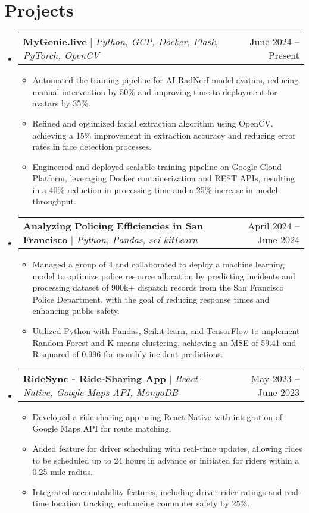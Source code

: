 \documentclass[letterpaper,11pt]{article}
\makeatletter
\newcommand{\resumeItem}[1]{
  \item\small{
    {#1 \vspace{-2pt}}
  }
}
\newcommand{\resumeProjectHeading}[2]{
    \item
    \begin{tabular*}{0.97\textwidth}{l@{\extracolsep{\fill}}r}
      \small#1 & #2 \\
    \end{tabular*}\vspace{-7pt}
}
\newcommand{\resumeSubHeadingListStart}{\begin{itemize}[leftmargin=0.15in, label={}]}
\newcommand{\resumeSubHeadingListEnd}{\end{itemize}}
\newcommand{\resumeItemListStart}{\begin{itemize}}
\newcommand{\resumeItemListEnd}{\end{itemize}\vspace{-5pt}}
\makeatother
\begin{document}
\section{Projects}
    \resumeSubHeadingListStart
        \resumeProjectHeading
          {\textbf{MyGenie.live} $|$ \emph{Python, GCP, Docker, Flask, PyTorch, OpenCV}}{June 2024 -- Present}
          \resumeItemListStart
            \resumeItem{Automated the training pipeline for AI RadNerf model avatars, reducing manual intervention by 50\% and improving time-to-deployment for avatars by 35\%.}
            \resumeItem{Refined and optimized facial extraction algorithm using OpenCV, achieving a 15\% improvement in extraction accuracy and reducing error rates in face detection processes.}
            \resumeItem{Engineered and deployed scalable training pipeline on Google Cloud Platform, leveraging Docker containerization and REST APIs, resulting in a 40\% reduction in processing time and a 25\% increase in model throughput.}
        \resumeItemListEnd
        \resumeProjectHeading
          {\textbf{Analyzing Policing Efficiencies in San Francisco} $|$ \emph{Python, Pandas, sci-kitLearn}}{April 2024 -- June 2024}
          \resumeItemListStart
            \resumeItem{Managed a group of 4 and collaborated to deploy a machine learning model to optimize police resource allocation by predicting incidents and   processing dataset of 900k+ dispatch records from the San Francisco Police Department, with the goal of reducing response times and enhancing public safety.}
            \resumeItem{Utilized Python with Pandas, Scikit-learn, and TensorFlow to implement Random Forest and K-means clustering, achieving an MSE of 59.41 and R-squared of 0.996 for monthly incident predictions.}
          \resumeItemListEnd
      \resumeProjectHeading
            {\textbf{RideSync - Ride-Sharing App} $|$ \emph{React-Native, Google Maps API, MongoDB}}{May 2023 -- June 2023}
            \resumeItemListStart
              \resumeItem{Developed a ride-sharing app using React-Native with integration of Google Maps API for route matching.}
              \resumeItem{Added feature for driver scheduling with real-time updates, allowing rides to be scheduled up to 24 hours in advance or initiated for riders within a 0.25-mile radius.}
              \resumeItem{Integrated accountability features, including driver-rider ratings and real-time location tracking, enhancing commuter safety by 25\%.}
          \resumeItemListEnd
    \resumeSubHeadingListEnd
\end{document}
